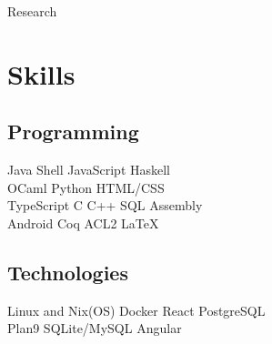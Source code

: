 \documentclass[letterpaper]{cv} %
\begin{document}
\begin{minipage}[t]{0.33\textwidth}
  Research
  \sectionspace


  \section{Skills}

  \subsection{Programming}
  Java \textbullet{} Shell \textbullet{} JavaScript \textbullet{} Haskell \\
  OCaml \textbullet{} Python \textbullet{} HTML/CSS \\
  TypeScript \textbullet{}  C \textbullet{} C++ \textbullet{} SQL \textbullet{} Assembly \\
  Android  \textbullet{} Coq \textbullet{} ACL2 \textbullet{} \LaTeX\ \\
  \sectionspace

  \subsection{Technologies}
  Linux and Nix(OS) \textbullet{} Docker \textbullet{} React  \textbullet{} PostgreSQL \\
  Plan9 \textbullet{} SQLite/MySQL \textbullet{} Angular \\
  \sectionspace

\end{minipage} %
\hfill
%
%
\end{document}
